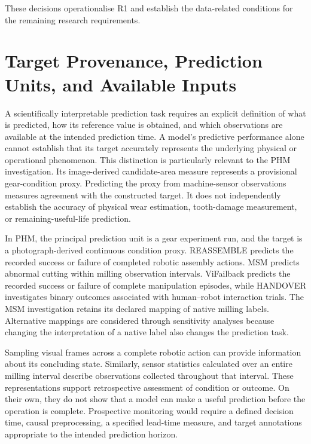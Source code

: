 These decisions operationalise R1 and establish the data-related conditions for the remaining research requirements.

\section{Target Provenance, Prediction Units, and Available Inputs}
\label{sec:ch4-targets}

A scientifically interpretable prediction task requires an explicit definition of what is predicted, how its reference value is obtained, and which observations are available at the intended prediction time. A model’s predictive performance alone cannot establish that its target accurately represents the underlying physical or operational phenomenon. This distinction is particularly relevant to the PHM investigation. Its image-derived candidate-area measure represents a provisional gear-condition proxy. Predicting the proxy from machine-sensor observations measures agreement with the constructed target. It does not independently establish the accuracy of physical wear estimation, tooth-damage measurement, or remaining-useful-life prediction.

In PHM, the principal prediction unit is a gear experiment run, and the target is a photograph-derived continuous condition proxy. REASSEMBLE predicts the recorded success or failure of completed robotic assembly actions. MSM predicts abnormal cutting within milling observation intervals. ViFailback predicts the recorded success or failure of complete manipulation episodes, while HANDOVER investigates binary outcomes associated with human–robot interaction trials. The MSM investigation retains its declared mapping of native milling labels. Alternative mappings are considered through sensitivity analyses because changing the interpretation of a native label also changes the prediction task.

Sampling visual frames across a complete robotic action can provide information about its concluding state. Similarly, sensor statistics calculated over an entire milling interval describe observations collected throughout that interval. These representations support retrospective assessment of condition or outcome. On their own, they do not show that a model can make a useful prediction before the operation is complete. Prospective monitoring would require a defined decision time, causal preprocessing, a specified lead-time measure, and target annotations appropriate to the intended prediction horizon.

